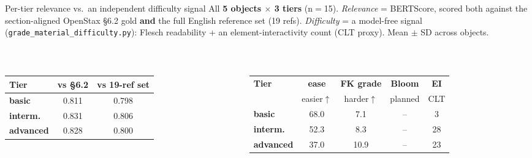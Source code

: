 \documentclass[aspectratio=169,10pt]{beamer}
\begin{document}
\begin{frame}{Per-tier relevance vs.\ an independent difficulty signal}
\scriptsize
All \textbf{5 objects $\times$ 3 tiers} (n$=$15). \emph{Relevance} = BERTScore, scored both against the
section-aligned OpenStax §6.2 gold \textbf{and} the full English reference set (19 refs). \emph{Difficulty}
= a model-free signal (\texttt{grade\_material\_difficulty.py}): Flesch readability + an element-interactivity
count (CLT proxy). Mean $\pm$ SD across objects.
\vspace{0.3em}
\renewcommand{\arraystretch}{1.25}
\begin{columns}[T]
\begin{column}{0.49\textwidth}
\\[2pt]
\begin{tabular}{@{}lcc@{}}
\toprule
\textbf{Tier} & \textbf{vs §6.2} & \textbf{vs 19-ref set} \\
\midrule
\rowcolor{cBasic!10}\textbf{\color{cBasic}basic} & 0.811 & 0.798 \\
\rowcolor{cInter!10}\textbf{\color{cInter}interm.} & 0.831 & 0.806 \\
\rowcolor{cAdv!10}\textbf{\color{cAdv}advanced} & 0.828 & 0.800 \\
\bottomrule
\end{tabular}
\end{column}
\begin{column}{0.49\textwidth}
\\[2pt]
\begin{tabular}{@{}lcccc@{}}
\toprule
\textbf{Tier} & \textbf{ease} & \textbf{FK grade} & {\color{cGrey}\textbf{Bloom}} & \textbf{EI} \\
 & {\tiny easier$\uparrow$} & {\tiny harder$\uparrow$} & {\tiny\color{cGrey} planned} & {\tiny CLT} \\
\midrule
\rowcolor{cBasic!10}\textbf{\color{cBasic}basic} & 68.0 & 7.1 & {\color{cGrey}--} & 3 \\
\rowcolor{cInter!10}\textbf{\color{cInter}interm.} & 52.3 & 8.3 & {\color{cGrey}--} & 28 \\
\rowcolor{cAdv!10}\textbf{\color{cAdv}advanced} & 37.0 & 10.9 & {\color{cGrey}--} & 23 \\
\bottomrule
\end{tabular}
\end{column}
\end{columns}
\vspace{0.4em}

\end{frame}
\end{document}
